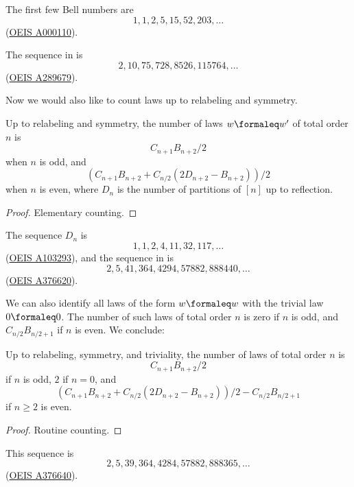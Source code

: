 The first few Bell numbers are
$$ 1, 1, 2, 5, 15, 52, 203, \dots$$
(\href{https://oeis.org/A000110}{OEIS A000110}).

The sequence in  is
$$ 2, 10, 75, 728, 8526, 115764, \dots$$
(\href{https://oeis.org/A289679}{OEIS A289679}).

Now we would also like to count laws up to relabeling and symmetry.

\begin{lemma}\label{law-count-sym}
  Up to relabeling and symmetry, the number of laws $w \formaleq w'$ of total order $n$ is
  $$ C_{n+1} B_{n+2}/2$$
  when $n$ is odd, and
  $$ (C_{n+1} B_{n+2} + C_{n/2} (2D_{n+2} - B_{n+2}))/2$$
  when $n$ is even, where $D_n$ is the number of partitions of $[n]$ up to reflection.
\end{lemma}

\begin{proof}
  Elementary counting.
\end{proof}

The sequence $D_n$ is
$$ 1, 1, 2, 4, 11, 32, 117, \dots$$
(\href{https://oeis.org/A103293}{OEIS A103293}), and the sequence in  is
$$ 2, 5, 41, 364, 4294, 57882, 888440, \dots$$
(\href{https://oeis.org/A376620}{OEIS A376620}).

We can also identify all laws of the form $w \formaleq w$ with the trivial law $0 \formaleq 0$. The number of such laws of total order $n$ is zero if $n$ is odd, and $C_{n/2} B_{n/2+1}$ if $n$ is even. We conclude:

\begin{lemma}\label{law-count-triv}
  Up to relabeling, symmetry, and triviality, the number of laws of total order $n$ is
  $$ C_{n+1} B_{n+2}/2$$
  if $n$ is odd, $2$ if $n = 0$, and
  $$ (C_{n+1} B_{n+2} + C_{n/2} (2D_{n+2} - B_{n+2}))/2 - C_{n/2} B_{n/2+1}$$
  if $n \geq 2$ is even.
\end{lemma}

\begin{proof}
  Routine counting.
\end{proof}

This sequence is
$$2, 5, 39, 364, 4284, 57882, 888365, \dots$$
(\href{https://oeis.org/A376640}{OEIS A376640}).

